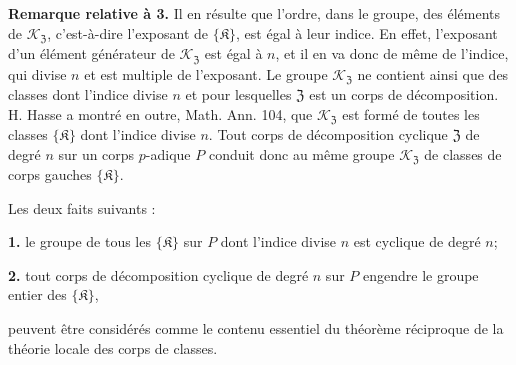\noindent\textbf{Remarque relative à 3.} Il en résulte que l'ordre, dans le groupe, des éléments de \(\mathscr K_{\mathfrak Z}\), c'est-à-dire l'exposant de \(\{\mathfrak K\}\), est égal à leur indice. En effet, l'exposant d'un élément générateur de \(\mathscr K_{\mathfrak Z}\) est égal à \(n\), et il en va donc de même de l'indice, qui divise \(n\) et est multiple de l'exposant. Le groupe \(\mathscr K_{\mathfrak Z}\) ne contient ainsi que des classes dont l'indice divise \(n\) et pour lesquelles \(\mathfrak Z\) est un corps de décomposition. H. Hasse a montré en outre, Math. Ann. 104, que \(\mathscr K_{\mathfrak Z}\) est formé de toutes les classes \(\{\mathfrak K\}\) dont l'indice divise \(n\). Tout corps de décomposition cyclique \(\mathfrak Z\) de degré \(n\) sur un corps \(p\)-adique \(P\) conduit donc au même groupe \(\mathscr K_{\mathfrak Z}\) de classes de corps gauches \(\{\mathfrak K\}\).

Les deux faits suivants :

\noindent\textbf{1.} le groupe de tous les \(\{\mathfrak K\}\) sur \(P\) dont l'indice divise \(n\) est cyclique de degré \(n\);

\noindent\textbf{2.} tout corps de décomposition cyclique de degré \(n\) sur \(P\) engendre le groupe entier des \(\{\mathfrak K\}\),

peuvent être considérés comme le contenu essentiel du théorème réciproque de la théorie locale des corps de classes.

\clearpage

